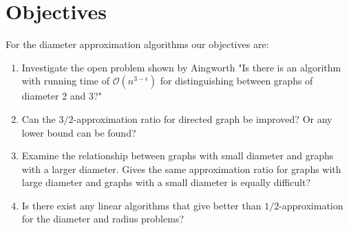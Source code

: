 \section{Objectives }


For the diameter approximation algorithms our objectives are:

\begin{enumerate}
    \item Investigate the open problem shown by Aingworth \etal \cite{siam1999} "Is there is an algorithm with running time of $\mathcal{O}(n^{3-\epsilon})$ for distinguishing between graphs of diameter 2 and 3?" 
    \item Can the $3/2$-approximation ratio for directed graph be improved? Or any lower bound can be found?
    \item Examine the relationship between graphs with small diameter and graphs with a larger diameter. Gives the same approximation ratio for graphs with large diameter and graphs with a small diameter is equally difficult?
    \item Is there exist any linear algorithms that give better than $1/2$-approximation for the diameter and radius problems?
\end{enumerate}
    
    
